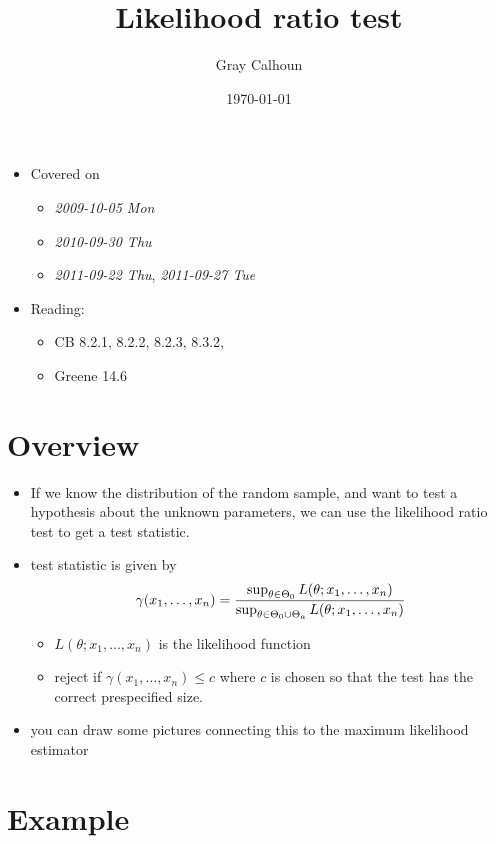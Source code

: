 \documentclass[11pt]{article}
\title{Likelihood ratio test}
\author{Gray Calhoun}
\date{\today}
\begin{document}
\maketitle

\setcounter{tocdepth}{2}
\tableofcontents
\vspace*{1cm}
\begin{itemize}
\item Covered on
\begin{itemize}
\item \textit{2009-10-05 Mon}
\item \textit{2010-09-30 Thu}
\item \textit{2011-09-22 Thu}, \textit{2011-09-27 Tue}
\end{itemize}
\item Reading:
\begin{itemize}
\item CB 8.2.1, 8.2.2, 8.2.3, 8.3.2,
\item Greene 14.6
\end{itemize}
\end{itemize}
\section{Overview}
\label{sec-1}

\begin{itemize}
\item If we know the distribution of the random sample, and want to
      test a hypothesis about the unknown parameters, we can use the
      likelihood ratio test to get a test statistic.
\item test statistic is given by
      \[\gamma(x_1,\dots,x_n) = {\sup_{\theta \in \Theta_0} L(\theta;
      x_1,\dots,x_n) \over \sup_{\theta \in \Theta_0 \cup \Theta_a} L(\theta;
      x_1,\dots,x_n)}\]
\begin{itemize}
\item $L(\theta; x_1,\dots,x_n)$ is the likelihood function
\item reject if $\gamma(x_1,\dots,x_n) \leq c$ where $c$ is chosen
        so that the test has the correct prespecified size.
\end{itemize}
\item you can draw some pictures connecting this to the maximum
      likelihood estimator
\end{itemize}
\section{Example}
\label{sec-2}
\end{document}
